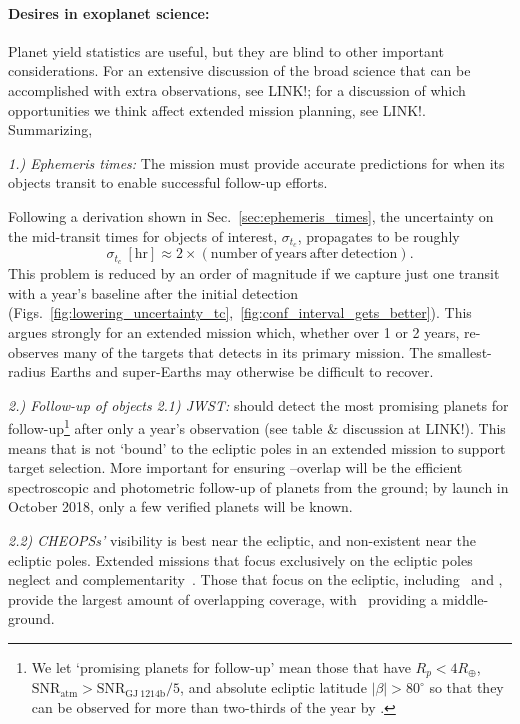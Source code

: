 \paragraph{Desires in exoplanet science:}
Planet yield statistics are useful, but they are blind to other important considerations. For an extensive discussion of the broad science that can be accomplished with extra \tess observations, see LINK!; for a discussion of which opportunities we think affect extended mission planning, see LINK!. Summarizing,

\textit{1.) Ephemeris times:}
The \tess mission must provide accurate predictions for when its objects transit to enable successful follow-up efforts.

Following a derivation shown in Sec.~\ref{sec:ephemeris_times},
the uncertainty on the mid-transit times for \tess objects of interest, $\sigma_{t_c}$, propagates to be roughly
$$\sigma_{t_c}\ \mathrm{[hr]} \approx 2\times\left(\mathrm{number\ of\ years\ after\ detection}\right). $$
This problem is reduced by an order of magnitude if we capture just one transit with a year's baseline after the initial detection (Figs.~\ref{fig:lowering_uncertainty_tc},~\ref{fig:conf_interval_gets_better}).
This argues strongly for an extended mission which, whether over 1 or 2 years, re-observes many of the targets that \tess detects in its primary mission. 
The smallest-radius Earths and super-Earths may otherwise be difficult to recover.

\textit{2.) Follow-up of \tess objects}\newline
\textit{2.1) JWST:} \tess should detect the most promising planets for \jwst follow-up\footnote{We let `promising planets for \jwst follow-up' mean those that have $R_p<4R_\oplus$, $\mathrm{SNR_{atm}} > \mathrm{SNR_{GJ\ 1214b}}/5$, and absolute ecliptic latitude $|\beta|>80^\circ$ so that they can be observed for more than two-thirds of the year by \jwst\!.} after only a year's observation (see table \& discussion at LINK!).
This means that \tess is not `bound' to the ecliptic poles in an extended mission to support \jwsts target selection.
More important for ensuring \jwst\!--\tess overlap will be the efficient spectroscopic and photometric follow-up of \tesss planets from the ground; by \jwsts launch in October 2018, only a few verified \tess planets will be known.

\textit{2.2) CHEOPSs'} visibility is best near the ecliptic, and non-existent near the ecliptic poles.
Extended missions that focus exclusively on the ecliptic poles neglect \tess and \cheopss complementarity~\citep{berta_cheops_2016}.
Those that focus on the ecliptic, including \elong\ and \eshort, provide the largest amount of overlapping coverage, with \nhemi\ providing a middle-ground.

